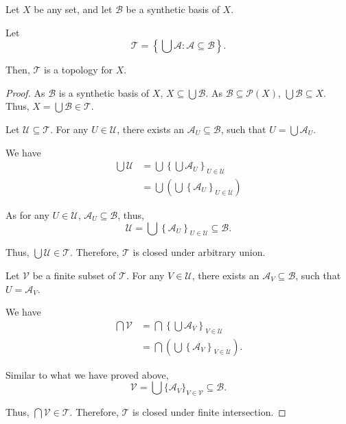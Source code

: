 \documentclass{report}
\begin{document}
\begin{lemma}
	Let $X$ be any set, and let $\mathcal B$ be a synthetic basis of $X$.
	
	Let
	$$
	\mathcal T = \left\{ \bigcup \mathcal A : \mathcal A \subseteq \mathcal B  \right\}.
	$$
	
	Then, $\mathcal T$ is a topology for $X$.
\end{lemma}


\begin{proof}
	As $\mathcal B$ is a synthetic basis of $X$, $X \subseteq \bigcup \mathcal B$. As $\mathcal B \subseteq \mathcal P(X)$, $\bigcup \mathcal B \subseteq X$. Thus, $X = \bigcup \mathcal B \in \mathcal T$.
	\qedlm

	Let $\mathcal U \subseteq \mathcal T$. For any $U \in \mathcal U$, there exists an $\mathcal A_U \subseteq \mathcal B$, such that $U = \bigcup \mathcal A_U$.
	
	We have
	$$
	\begin{aligned}
		\bigcup \mathcal U &= \bigcup \left\{ \bigcup \mathcal A_U \right\}_{U \in \mathcal U} \\
		&= \bigcup \left( \bigcup \left\{ \mathcal A_U \right\}_{U \in \mathcal U} \right)
	\end{aligned}
	$$
	
	As for any $U \in \mathcal U$, $\mathcal A_U \subseteq \mathcal B$, thus,
	$$
	\mathcal U = \bigcup \left\{ \mathcal A_U \right\}_{U \in \mathcal U} \subseteq \mathcal B.
	$$
	
	Thus, $\bigcup \mathcal U \in \mathcal T$. Therefore, $\mathcal T$ is closed under arbitrary union.
	\qedlm
	
	Let $\mathcal V$ be a finite subset of $\mathcal T$. For any $V \in \mathcal U$, there exists an $\mathcal A_V \subseteq \mathcal B$, such that $U = \mathcal A_V$.
	
	We have
	$$
	\begin{aligned}
		\bigcap \mathcal V &= \bigcap \left\{ \bigcup \mathcal A_V \right\}_{V \in \mathcal U} \\
		&= \bigcap \left( \bigcup \left\{ \mathcal A_V \right\}_{V \in \mathcal U} \right).
	\end{aligned}
	$$
	
	Similar to what we have proved above,
	$$
	\mathcal V = \bigcup \{\mathcal A_V\}_{V \in \mathcal V} \subseteq \mathcal B.
	$$
	
	Thus, $\bigcap \mathcal V \in \mathcal T$. Therefore, $\mathcal T$ is closed under finite intersection.
\end{proof}
\end{document}
